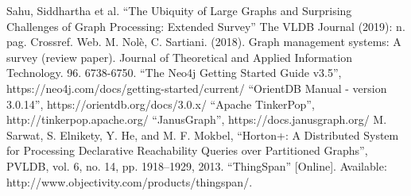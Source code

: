 \documentclass[conference]{IEEEtran}
\begin{document}
\begin{thebibliography}{00}
 Sahu, Siddhartha et al. ``The Ubiquity of Large Graphs and Surprising Challenges of Graph Processing: Extended Survey'' The VLDB Journal (2019): n. pag. Crossref. Web.
 M. Nolè, C. Sartiani. (2018). Graph management systems: A survey (review paper). Journal of Theoretical and Applied Information Technology. 96. 6738-6750.
 ``The Neo4j Getting Started Guide v3.5'',
    https://neo4j.com/docs/getting-started/current/
 ``OrientDB Manual - version 3.0.14'',
    https://orientdb.org/docs/3.0.x/
 ``Apache TinkerPop'',
    http://tinkerpop.apache.org/
 ``JanusGraph'',
     https://docs.janusgraph.org/
 M. Sarwat, S. Elnikety, Y. He, and M. F. Mokbel, ``Horton+: A Distributed System for Processing Declarative Reachability Queries over Partitioned Graphs'', PVLDB, vol. 6, no. 14, pp. 1918–1929, 2013.
 ``ThingSpan'' [Online]. Available: http://www.objectivity.com/products/thingspan/.
\end{thebibliography}
\end{document}
